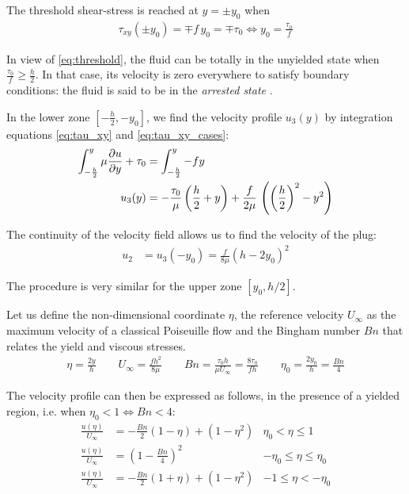 \documentclass[11 pt]{report}
\begin{document}
The threshold shear-stress is reached at $y=\pm y_0$ when 
\begin{align}
    \tau_{xy}(\pm y_0) = \mp f \, y_0 = \mp \tau_0 \iff y_0 = \frac{\tau_0}{f} \label{eq:threshold}
\end{align}

In view of \eqref{eq:threshold}, the fluid can be totally in the unyielded state when $\frac{\tau_0}{f} \geq \frac{h}{2}$. In that case, its velocity is zero everywhere to satisfy boundary conditions: the fluid is said to be in the \textit{arrested state} \cite{Saramito}.

In the lower zone $[-\frac{h}{2}, -y_0]$, we find the velocity profile $u_3(y)$ by integration equations \eqref{eq:tau_xy} and \eqref{eq:tau_xy_cases}:
\begin{align}
    \int_{-\frac{h}{2}}^y \mu \pdv{u}{y} + \tau_0 &= \int_{-\frac{h}{2}}^y -f y\\
    u_3(y) &= -\frac{\tau_0}{\mu} \left(\frac{h}{2}+y\right) + \frac{f}{2\mu} \, \left(\left(\frac{h}{2}\right)^2 - y^2\right)
\end{align}

The continuity of the velocity field allows us to find the velocity of the plug:
\begin{align}
    u_2 &= u_3(-y_0) = %
    \frac{f}{8\mu} \left(h - 2y_0\right)^2
\end{align}

The procedure is very similar for the upper zone $[y_0, h/2]$.

Let us define the non-dimensional coordinate $\eta$, the reference velocity $U_{\infty}$ as the maximum velocity of a classical Poiseuille flow and the Bingham number $Bn$ that relates the yield and viscous stresses.
\begin{align}
    \eta=\frac{2y}{h} \qquad U_{\infty}= \frac{f h^2}{8\mu} \qquad Bn=\frac{\tau_0 h}{\mu U_{\infty}}=\frac{8\tau_0}{f h} \qquad \eta_0 = \frac{2y_0}{h} = \frac{Bn}{4}
\end{align}

The velocity profile can then be expressed as follows, in the presence of a yielded region, i.e. when $\eta_0 < 1 \iff Bn < 4$:
\begin{align}
    \frac{u(\eta)}{U_{\infty}} &= -\frac{Bn}{2}(1-\eta) + (1-\eta^2) & \eta_0 < \eta \leq 1\\
    \frac{u(\eta)}{U_{\infty}} &= \left(1 - \frac{Bn}{4} \right)^2 & -\eta_0 \leq \eta \leq \eta_0 \\
    \frac{u(\eta)}{U_{\infty}} &= -\frac{Bn}{2}(1+\eta) + (1-\eta^2) & -1 \leq \eta < -\eta_0
\end{align}
\end{document}
